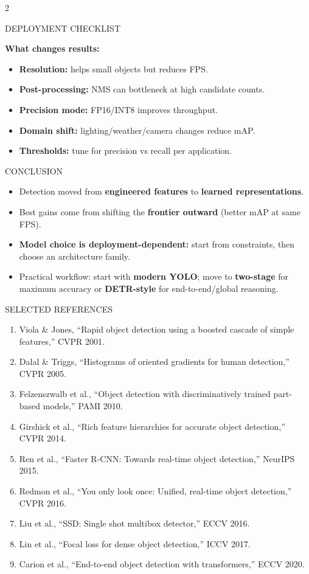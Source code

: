 \documentclass[10pt]{article}
\begin{document}
\begin{multicols}{2}
\begin{sectionbox}{DEPLOYMENT CHECKLIST}
\vspace{1mm}
\raggedright
\textbf{What changes results:}
\begin{itemize}
\item \textbf{Resolution:} helps small objects but reduces FPS.
\item \textbf{Post-processing:} NMS can bottleneck at high candidate counts.
\item \textbf{Precision mode:} FP16/INT8 improves throughput.
\item \textbf{Domain shift:} lighting/weather/camera changes reduce mAP.
\item \textbf{Thresholds:} tune for precision vs recall per application.
\end{itemize}
\end{sectionbox}

\begin{sectionbox}{CONCLUSION}
\small
\begin{itemize}
\item Detection moved from \textbf{engineered features} to \textbf{learned representations}.
\item Best gains come from shifting the \textbf{frontier outward} (better mAP at same FPS).
\item \textbf{Model choice is deployment-dependent:} start from constraints, then choose an architecture family.
\item Practical workflow: start with \textbf{modern YOLO}; move to \textbf{two-stage} for maximum accuracy or \textbf{DETR-style} for end-to-end/global reasoning.
\end{itemize}
\end{sectionbox}

\begin{sectionbox}{SELECTED REFERENCES}
\begingroup
\fontsize{6.6}{7.2}\selectfont
\setlength{\parskip}{0pt}
\begin{enumerate}
\item Viola \& Jones, ``Rapid object detection using a boosted cascade of simple features,'' CVPR 2001.
\item Dalal \& Triggs, ``Histograms of oriented gradients for human detection,'' CVPR 2005.
\item Felzenszwalb et al., ``Object detection with discriminatively trained part-based models,'' PAMI 2010.
\item Girshick et al., ``Rich feature hierarchies for accurate object detection,'' CVPR 2014.
\item Ren et al., ``Faster R-CNN: Towards real-time object detection,'' NeurIPS 2015.
\item Redmon et al., ``You only look once: Unified, real-time object detection,'' CVPR 2016.
\item Liu et al., ``SSD: Single shot multibox detector,'' ECCV 2016.
\item Lin et al., ``Focal loss for dense object detection,'' ICCV 2017.
\item Carion et al., ``End-to-end object detection with transformers,'' ECCV 2020.
\end{enumerate}
\endgroup
\end{sectionbox}

\end{multicols}
\end{document}
